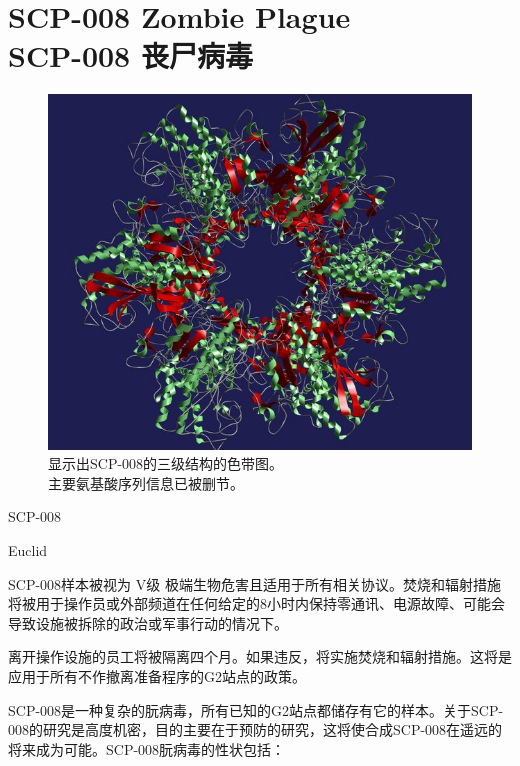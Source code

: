 \chapter[SCP-008 丧尸病毒]{
	SCP-008 Zombie Plague\\
	SCP-008 丧尸病毒
}

\label{chap:SCP-008}

\begin{scpbox}




\end{scpbox}


\begin{figure}[H]
	\centering
	\includegraphics[width=0.5\linewidth]{images/SCP-008.jpg}
	\caption*{显示出SCP-008的三级结构的色带图。\\主要氨基酸序列信息已被删节。}
\end{figure}

SCP-008

Euclid

SCP-008样本被视为 V级 极端生物危害且适用于所有相关协议。焚烧和辐射措施将被用于操作员或外部频道在任何给定的8小时内保持零通讯、电源故障、可能会导致设施被拆除的政治或军事行动的情况下。

离开操作设施的员工将被隔离四个月。如果违反，将实施焚烧和辐射措施。这将是应用于所有不作撤离准备程序的G2站点的政策。

SCP-008是一种复杂的朊病毒，所有已知的G2站点都储存有它的样本。关于SCP-008的研究是高度机密，目的主要在于预防的研究，这将使合成SCP-008在遥远的将来成为可能。SCP-008朊病毒的性状包括：

